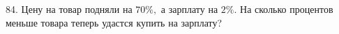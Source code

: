 84. Цену на товар подняли на $70\%,$ а зарплату на $2\%.$ На сколько процентов меньше товара теперь удастся купить на зарплату?\\
